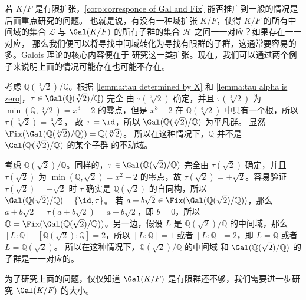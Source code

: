 若 $K/F$ 是有限扩张，\autoref{coro:corresponce of Gal and Fix} 能否推广到一般的情况是后面重点研究的问题。
也就是说，有没有一种域扩张 $K/F$，使得 $K/F$ 的所有中间域的集合 $\mathcal{L}$ 与
$\Gal(K/F)$ 的所有子群的集合 $\mathcal{H}$ 之间一一对应？如果存在一一对应，
那么我们便可以将寻找中间域转化为寻找有限群的子群，这通常要容易的多。Galois 理论的核心内容便在于
研究这一类扩张。现在，我们可以通过两个例子来说明上面的情况可能存在也可能不存在。

\begin{example}\label{exa:Galois theory 1}
  考虑 $\mathbb{Q}(\sqrt[3]{2})/\mathbb{Q}$。根据 \autoref{lemma:tau determined by X} 和
  \autoref{lemma:tau alpha is zero}，$\tau\in\Gal(\mathbb{Q}(\sqrt[3]{2})/\mathbb{Q})$ 完全
  由 $\tau(\sqrt[3]{2})$ 确定，并且 $\tau(\sqrt[3]{2})$ 为 $\min(\mathbb{Q},\sqrt[3]{2})=x^3-2$
  的零点，但是 $x^3-2$ 在 $\mathbb{Q}(\sqrt[3]{2})$ 中只有一个根，所以 $\tau(\sqrt[3]{2})=\sqrt[3]{2}$，
  故 $\tau=\id$，所以 $\Gal(\mathbb{Q}(\sqrt[3]{2})/\mathbb{Q})$ 为平凡群。
  显然 $\Fix(\Gal(\mathbb{Q}(\sqrt[3]{2})/\mathbb{Q}))=\mathbb{Q}(\sqrt[3]{2})$。
  所以在这种情况下，$\mathbb{Q}$ 并不是 $\Gal(\mathbb{Q}(\sqrt[3]{2})/\mathbb{Q})$ 的某个子群
  的不动域。
\end{example}

\begin{example}
  考虑 $\mathbb{Q}(\sqrt{2})/\mathbb{Q}$。同样的，$\tau\in\Gal(\mathbb{Q}(\sqrt{2})/\mathbb{Q})$
  完全由 $\tau(\sqrt{2})$ 确定，并且 $\tau(\sqrt{2})$ 为 $\min(\mathbb{Q},\sqrt{2})=x^2-2$
  的零点，故 $\tau(\sqrt{2})=\pm\sqrt{2}$。容易验证 $\tau(\sqrt{2})=-\sqrt{2}$ 时 $\tau$
  确实是 $\mathbb{Q}(\sqrt{2})$ 的自同构，所以 $\Gal(\mathbb{Q}(\sqrt{2})/\mathbb{Q})=\{\id,\tau\}$。
  若 $a+b\sqrt{2}\in\Fix(\Gal(\mathbb{Q}(\sqrt{2})/\mathbb{Q}))$，那么
  $a+b\sqrt{2}=\tau(a+b\sqrt{2})=a-b\sqrt{2}$，即 $b=0$，所以 
  $\mathbb{Q}=\Fix(\Gal(\mathbb{Q}(\sqrt{2})/\mathbb{Q}))$。另一边，假设
  $L$ 是 $\mathbb{Q}(\sqrt{2})/\mathbb{Q}$ 的中间域，那么 
  $[L:\mathbb{Q}]\mid [\mathbb{Q}(\sqrt{2}):\mathbb{Q}]=2$，所以 $[L:\mathbb{Q}]=1$ 或者
  $[L:\mathbb{Q}]=2$，即 $L=\mathbb{Q}$ 或者 $L=\mathbb{Q}(\sqrt{2})$。
  所以在这种情况下，$\mathbb{Q}(\sqrt{2})/\mathbb{Q}$ 的中间域
  和 $\Gal(\mathbb{Q}(\sqrt{2})/\mathbb{Q})$ 的子群是一一对应的。
\end{example}

为了研究上面的问题，仅仅知道 $\Gal(K/F)$ 是有限群还不够，我们需要进一步研究 $\Gal(K/F)$ 的大小。

